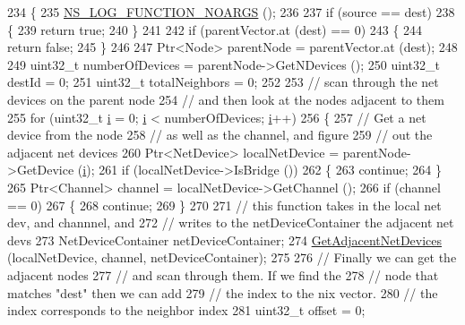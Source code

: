 \begin{DoxyCode}
234 \{
235   \hyperlink{log-macros-disabled_8h_a8f7e4afc291c9d29a65c18ac1f79197b}{NS\_LOG\_FUNCTION\_NOARGS} ();
236 
237   \textcolor{keywordflow}{if} (source == dest)
238     \{
239       \textcolor{keywordflow}{return} \textcolor{keyword}{true};
240     \}
241 
242   \textcolor{keywordflow}{if} (parentVector.at (dest) == 0)
243     \{
244       \textcolor{keywordflow}{return} \textcolor{keyword}{false};
245     \}
246 
247   Ptr<Node> parentNode = parentVector.at (dest);
248 
249   uint32\_t numberOfDevices = parentNode->GetNDevices ();
250   uint32\_t destId = 0;
251   uint32\_t totalNeighbors = 0;
252 
253   \textcolor{comment}{// scan through the net devices on the parent node}
254   \textcolor{comment}{// and then look at the nodes adjacent to them}
255   \textcolor{keywordflow}{for} (uint32\_t \hyperlink{bernuolliDistribution_8m_a6f6ccfcf58b31cb6412107d9d5281426}{i} = 0; \hyperlink{bernuolliDistribution_8m_a6f6ccfcf58b31cb6412107d9d5281426}{i} < numberOfDevices; \hyperlink{bernuolliDistribution_8m_a6f6ccfcf58b31cb6412107d9d5281426}{i}++)
256     \{
257       \textcolor{comment}{// Get a net device from the node}
258       \textcolor{comment}{// as well as the channel, and figure}
259       \textcolor{comment}{// out the adjacent net devices}
260       Ptr<NetDevice> localNetDevice = parentNode->GetDevice (\hyperlink{bernuolliDistribution_8m_a6f6ccfcf58b31cb6412107d9d5281426}{i});
261       \textcolor{keywordflow}{if} (localNetDevice->IsBridge ())
262         \{
263           \textcolor{keywordflow}{continue};
264         \}
265       Ptr<Channel> channel = localNetDevice->GetChannel ();
266       \textcolor{keywordflow}{if} (channel == 0)
267         \{
268           \textcolor{keywordflow}{continue};
269         \}
270 
271       \textcolor{comment}{// this function takes in the local net dev, and channnel, and}
272       \textcolor{comment}{// writes to the netDeviceContainer the adjacent net devs}
273       NetDeviceContainer netDeviceContainer;
274       \hyperlink{classns3_1_1Ipv4NixVectorRouting_a1037f3752d6583eca8cd83c72e0673ea}{GetAdjacentNetDevices} (localNetDevice, channel, netDeviceContainer);
275 
276       \textcolor{comment}{// Finally we can get the adjacent nodes}
277       \textcolor{comment}{// and scan through them.  If we find the }
278       \textcolor{comment}{// node that matches "dest" then we can add }
279       \textcolor{comment}{// the index  to the nix vector.}
280       \textcolor{comment}{// the index corresponds to the neighbor index}
281       uint32\_t offset = 0;

\end{DoxyCode}
